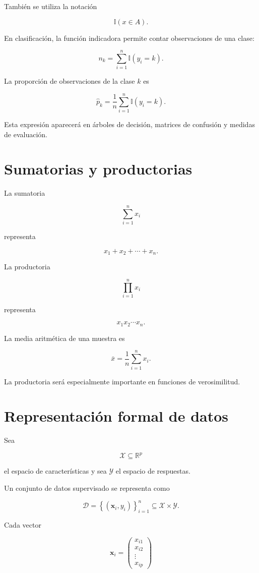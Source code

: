 \documentclass[
  spanish,
  11pt,
  letterpaper,
  DIV=11,
  numbers=noendperiod]{scrreprt}
\theoremstyle{definition}
\theoremstyle{plain}
\theoremstyle{definition}
\theoremstyle{remark}
\begin{document}
También se utiliza la notación

\[
\mathbb{I}(x\in A).
\]

En clasificación, la función indicadora permite contar observaciones de
una clase:

\[
n_k
=
\sum_{i=1}^{n}
\mathbb{I}(y_i=k).
\]

La proporción de observaciones de la clase \(k\) es

\[
\widehat{p}_k
=
\frac{1}{n}
\sum_{i=1}^{n}
\mathbb{I}(y_i=k).
\]

Esta expresión aparecerá en árboles de decisión, matrices de confusión y
medidas de evaluación.

\section{Sumatorias y productorias}\label{sumatorias-y-productorias}

La sumatoria

\[
\sum_{i=1}^{n}x_i
\]

representa

\[
x_1+x_2+\cdots+x_n.
\]

La productoria

\[
\prod_{i=1}^{n}x_i
\]

representa

\[
x_1x_2\cdots x_n.
\]

La media aritmética de una muestra es

\[
\bar{x}
=
\frac{1}{n}
\sum_{i=1}^{n}x_i.
\]

La productoria será especialmente importante en funciones de
verosimilitud.

\section{Representación formal de
datos}\label{representaciuxf3n-formal-de-datos}

Sea

\[
\mathcal{X}\subseteq\mathbb{R}^{p}
\]

el espacio de características y sea \(\mathcal{Y}\) el espacio de
respuestas.

Un conjunto de datos supervisado se representa como

\[
\mathcal{D}
=
\left\{
(\mathbf{x}_i,y_i)
\right\}_{i=1}^{n}
\subseteq
\mathcal{X}\times\mathcal{Y}.
\]

Cada vector

\[
\mathbf{x}_i
=
\begin{pmatrix}
x_{i1}\\
x_{i2}\\
\vdots\\
x_{ip}
\end{pmatrix}
\]
\end{document}
